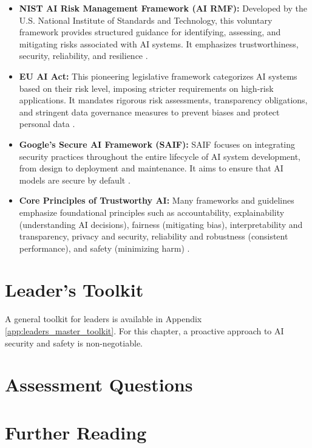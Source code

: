 \begin{itemize}
    \item \textbf{NIST AI Risk Management Framework (AI RMF):} Developed by the U.S. National Institute of Standards and Technology, this voluntary framework provides structured guidance for identifying, assessing, and mitigating risks associated with AI systems. It emphasizes trustworthiness, security, reliability, and resilience \parencite{NIST2023AIRMF}.
    \item \textbf{EU AI Act:} This pioneering legislative framework categorizes AI systems based on their risk level, imposing stricter requirements on high-risk applications. It mandates rigorous risk assessments, transparency obligations, and stringent data governance measures to prevent biases and protect personal data \parencite{EU_AI_Act_2024}.
    \item \textbf{Google's Secure AI Framework (SAIF):} SAIF focuses on integrating security practices throughout the entire lifecycle of AI system development, from design to deployment and maintenance. It aims to ensure that AI models are secure by default \parencite{SafetyGoogle2023}.
    \item \textbf{Core Principles of Trustworthy AI:} Many frameworks and guidelines emphasize foundational principles such as accountability, explainability (understanding AI decisions), fairness (mitigating bias), interpretability and transparency, privacy and security, reliability and robustness (consistent performance), and safety (minimizing harm) \parencite{MaximAI2025}.
\end{itemize}

\section{Leader's Toolkit}
\label{sec:security_leaders_toolkit}

A general toolkit for leaders is available in Appendix \ref{app:leaders_master_toolkit}. For this chapter, a proactive approach to AI security and safety is non-negotiable.

\section{Assessment Questions}
\label{sec:security_assessment_questions}

\section{Further Reading}
\label{sec:security_further_reading}
